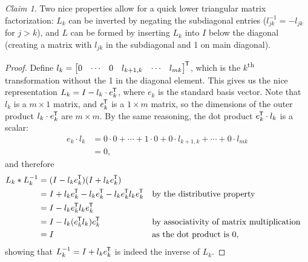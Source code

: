 \documentclass[12pt,letterpaper,DIV=11]{scrartcl}
\theoremstyle{plain}
\theoremstyle{definition}
\theoremstyle{remark}
\newtheorem{claim}{Claim}
\begin{document}
\begin{claim}
  Two nice properties allow for a quick lower triangular matrix factorization:
  $L_k$ can be inverted by negating the subdiagonal entries ($l_{jk}^{-1} = -l_{jk}$ for $j > k$), and
  $L$ can be formed by inserting $L_k$ into $I$ below the diagonal (creating a matrix with $l_{jk}$ in the subdiagonal and 1 on main diagonal).

  \begin{proof}
    Define $l_k = \begin{bmatrix}
      0 & \cdots & 0 & l_{k + 1, k} & \cdots & l_{mk}
    \end{bmatrix}^{\mkern-1.5mu\mathsf{T}}$, which is the $k$\textsuperscript{th} transformation without the 1 in the diagonal element.
    This gives us the nice representation $L_k = I - l_k \cdot e_k^{\mkern-1.5mu\mathsf{T}}$, where $e_k$ is the standard basis vector.
    Note that $l_k$ is a $m \times 1$ matrix, and $e_k^{\mkern-1.5mu\mathsf{T}}$ is a $1 \times m$ matrix, so the dimensions of the outer product $l_k \cdot e_k^{\mkern-1.5mu\mathsf{T}}$ are $m \times m$.
    By the same reasoning, the dot product $e_k^{\mkern-1.5mu\mathsf{T}} \cdot l_k$ is a scalar: \begin{align*}
      e_k \cdot l_k &= 0 \cdot 0 + \cdots + 1 \cdot 0 + 0 \cdot l_{k + 1, k} + \cdots + 0 \cdot l_{mk} \\
                    &= 0,
    \end{align*} and therefore
    \begin{align*}
      L_k * L_k^{-1} &= (I - l_k e_k^{\mkern-1.5mu\mathsf{T}}) (I + l_k e_k^{\mkern-1.5mu\mathsf{T}}) \\
                     &= I + l_k e_k^{\mkern-1.5mu\mathsf{T}} - l_k e_k^{\mkern-1.5mu\mathsf{T}} - l_k e_k^{\mkern-1.5mu\mathsf{T}} l_k e_k^{\mkern-1.5mu\mathsf{T}} && \text{by the distributive property} \\
                     &= I - l_k e_k^{\mkern-1.5mu\mathsf{T}} l_k e_k^{\mkern-1.5mu\mathsf{T}} \\
                     &= I - l_k (e_k^{\mkern-1.5mu\mathsf{T}} l_k) e_k^{\mkern-1.5mu\mathsf{T}} && \text{by associativity of matrix multiplication} \\
                     &= I && \text{as the dot product is 0},
    \end{align*} showing that $L_k^{-1} = I + l_k e_k^{\mkern-1.5mu\mathsf{T}}$ is indeed the inverse of $L_k$.


\end{proof}
\end{claim}
\end{document}
